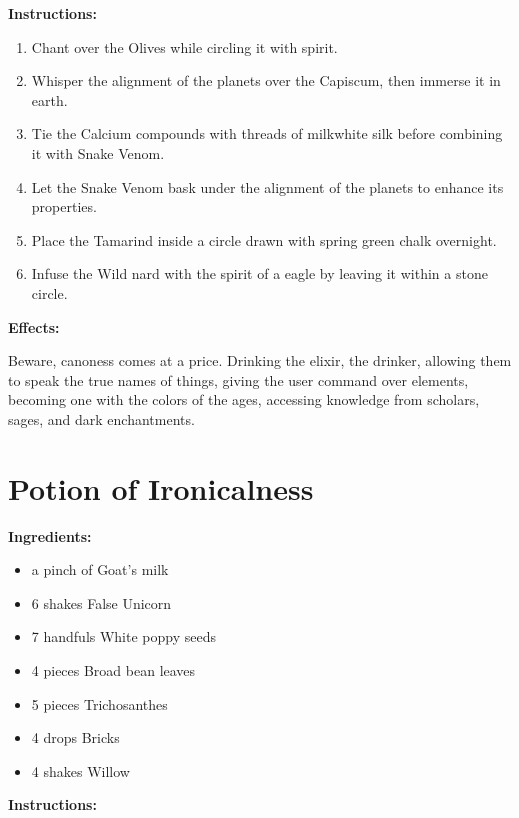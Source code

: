\documentclass{article}
\begin{document}
\textbf{Instructions:}

\begin{enumerate}
  \item Chant over the Olives while circling it with spirit.
  \item Whisper the alignment of the planets over the Capiscum, then immerse it in earth.
  \item Tie the Calcium compounds with threads of milkwhite silk before combining it with Snake Venom.
  \item Let the Snake Venom bask under the alignment of the planets to enhance its properties.
  \item Place the Tamarind inside a circle drawn with spring green chalk overnight.
  \item Infuse the Wild nard with the spirit of a eagle by leaving it within a stone circle.
\end{enumerate}

\textbf{Effects:}

Beware, canoness comes at a price. Drinking the elixir, the drinker, allowing them to speak the true names of things, giving the user command over elements, becoming one with the colors of the ages, accessing knowledge from scholars, sages, and dark enchantments.

\newpage
\section*{Potion of Ironicalness}

\textbf{Ingredients:}

\begin{itemize}
  \item a pinch of Goat's milk
  \item 6 shakes False Unicorn
  \item 7 handfuls White poppy seeds
  \item 4 pieces Broad bean leaves
  \item 5 pieces Trichosanthes
  \item 4 drops Bricks
  \item 4 shakes Willow
\end{itemize}

\textbf{Instructions:}
\end{document}
